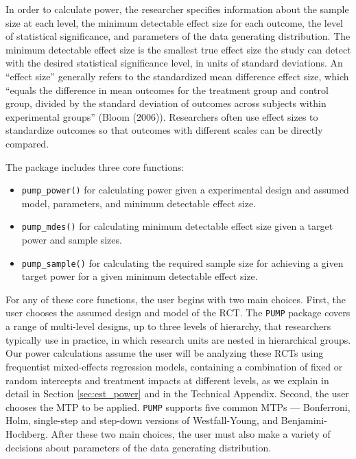 \documentclass[
]{article}
\providecommand{\tightlist}{%
  \setlength{\itemsep}{0pt}\setlength{\parskip}{0pt}}
\begin{document}
In order to calculate power, the researcher specifies information about
the sample size at each level, the minimum detectable effect size for
each outcome, the level of statistical significance, and parameters of
the data generating distribution. The minimum detectable effect size is
the smallest true effect size the study can detect with the desired
statistical significance level, in units of standard deviations. An
``effect size'' generally refers to the standardized mean difference
effect size, which ``equals the difference in mean outcomes for the
treatment group and control group, divided by the standard deviation of
outcomes across subjects within experimental groups'' (Bloom (2006)).
Researchers often use effect sizes to standardize outcomes so that
outcomes with different scales can be directly compared.

The package includes three core functions:

\begin{itemize}
\tightlist
\item
  \texttt{pump\_power()} for calculating power given a experimental
  design and assumed model, parameters, and minimum detectable effect
  size.
\item
  \texttt{pump\_mdes()} for calculating minimum detectable effect size
  given a target power and sample sizes.
\item
  \texttt{pump\_sample()} for calculating the required sample size for
  achieving a given target power for a given minimum detectable effect
  size.
\end{itemize}

For any of these core functions, the user begins with two main choices.
First, the user chooses the assumed design and model of the RCT. The
\texttt{PUMP} package covers a range of multi-level designs, up to three
levels of hierarchy, that researchers typically use in practice, in
which research units are nested in hierarchical groups. Our power
calculations assume the user will be analyzing these RCTs using
frequentist mixed-effects regression models, containing a combination of
fixed or random intercepts and treatment impacts at different levels, as
we explain in detail in Section \ref{sec:est_power} and in the Technical
Appendix. Second, the user chooses the MTP to be applied. \texttt{PUMP}
supports five common MTPs --- Bonferroni, Holm, single-step and
step-down versions of Westfall-Young, and Benjamini-Hochberg. After
these two main choices, the user must also make a variety of decisions
about parameters of the data generating distribution.
\end{document}
